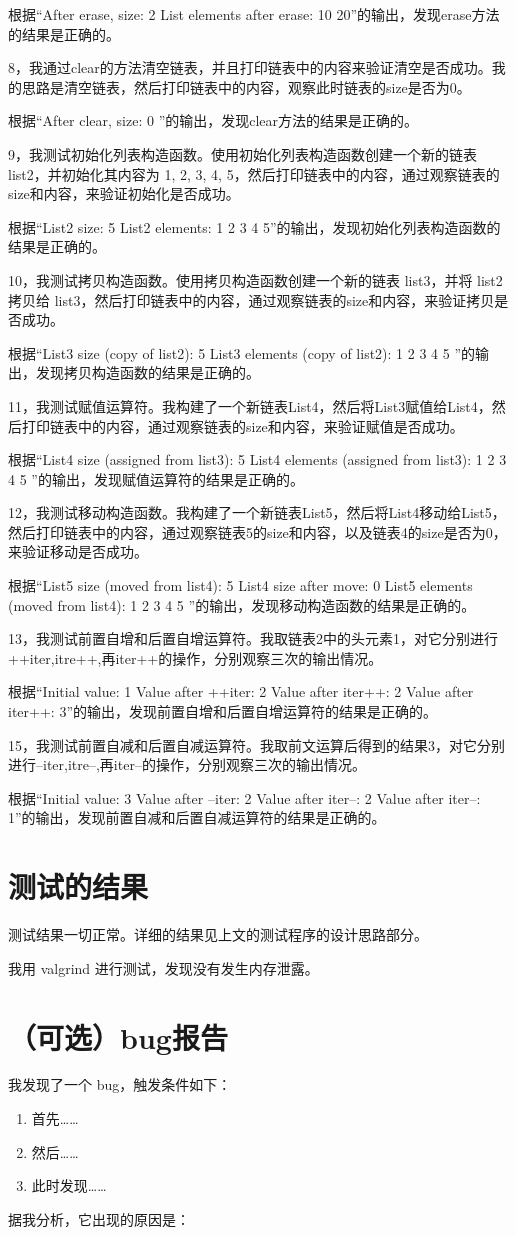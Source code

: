 \documentclass[UTF8]{ctexart}
\begin{document}
根据“After erase, size: 2  List elements after erase: 10 20”的输出，发现erase方法的结果是正确的。

8，我通过clear的方法清空链表，并且打印链表中的内容来验证清空是否成功。我的思路是清空链表，然后打印链表中的内容，观察此时链表的size是否为0。

根据“After clear, size: 0   ”的输出，发现clear方法的结果是正确的。

9，我测试初始化列表构造函数。使用初始化列表构造函数创建一个新的链表 list2，并初始化其内容为 {1, 2, 3, 4, 5}，然后打印链表中的内容，通过观察链表的size和内容，来验证初始化是否成功。

根据“List2 size: 5  List2 elements: 1 2 3 4 5”的输出，发现初始化列表构造函数的结果是正确的。

10，我测试拷贝构造函数。使用拷贝构造函数创建一个新的链表 list3，并将 list2 拷贝给 list3，然后打印链表中的内容，通过观察链表的size和内容，来验证拷贝是否成功。

根据“List3 size (copy of list2): 5  List3 elements (copy of list2): 1 2 3 4 5 ”的输出，发现拷贝构造函数的结果是正确的。

11，我测试赋值运算符。我构建了一个新链表List4，然后将List3赋值给List4，然后打印链表中的内容，通过观察链表的size和内容，来验证赋值是否成功。

根据“List4 size (assigned from list3): 5  List4 elements (assigned from list3): 1 2 3 4 5 ”的输出，发现赋值运算符的结果是正确的。

12，我测试移动构造函数。我构建了一个新链表List5，然后将List4移动给List5，然后打印链表中的内容，通过观察链表5的size和内容，以及链表4的size是否为0，来验证移动是否成功。

根据“List5 size (moved from list4): 5  List4 size after move: 0  List5 elements (moved from list4): 1 2 3 4 5 ”的输出，发现移动构造函数的结果是正确的。

13，我测试前置自增和后置自增运算符。我取链表2中的头元素1，对它分别进行++iter,itre++,再iter++的操作，分别观察三次的输出情况。

根据“Initial value: 1  Value after ++iter: 2  Value after iter++: 2  Value after iter++: 3”的输出，发现前置自增和后置自增运算符的结果是正确的。

15，我测试前置自减和后置自减运算符。我取前文运算后得到的结果3，对它分别进行--iter,itre--,再iter--的操作，分别观察三次的输出情况。

根据“Initial value: 3  Value after --iter: 2  Value after iter--: 2  Value after iter--: 1”的输出，发现前置自减和后置自减运算符的结果是正确的。

\section{测试的结果}

测试结果一切正常。详细的结果见上文的测试程序的设计思路部分。

我用 valgrind 进行测试，发现没有发生内存泄露。

\section{（可选）bug报告}

我发现了一个 bug，触发条件如下：

\begin{enumerate}
    \item 首先……
    \item 然后……
    \item 此时发现……
\end{enumerate}

据我分析，它出现的原因是：
\end{document}
